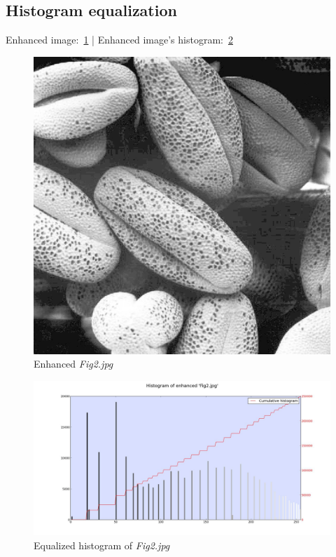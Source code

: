     \subsection{Histogram equalization}

    Enhanced image:~\ref{diagram:enhanced_fig2} |
    Enhanced image's histogram:~\ref{diagram:equal_hist_fig2}

    \begin{figure}[h]
        \centering
        \includegraphics[width=0.7\linewidth]{./images/Enhanced_Fig2.jpg}
        \caption{Enhanced \textit{Fig2.jpg}}
        \label{diagram:enhanced_fig2}
    \end{figure}

    \begin{figure}[h]
        \centering
        \includegraphics[width=\linewidth]{./images/Equalized_Histogram_Fig2.jpg}
        \caption{Equalized histogram of \textit{Fig2.jpg}}
        \label{diagram:equal_hist_fig2}
    \end{figure}
